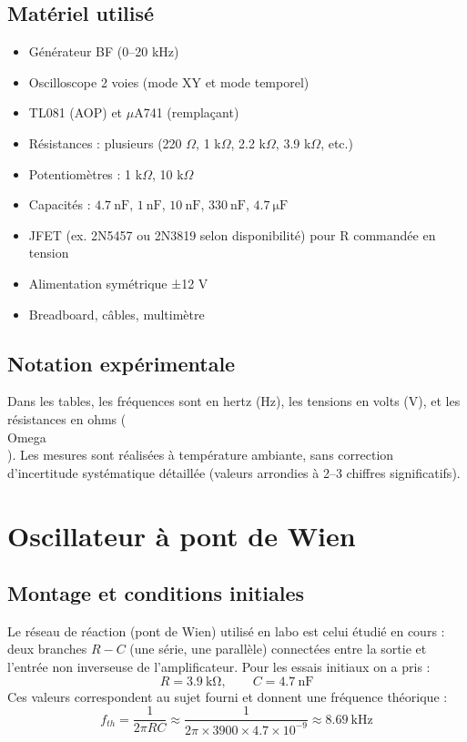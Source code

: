 \documentclass[11pt,a4paper]{report}
\begin{document}
\section*{Matériel utilisé}
\begin{itemize}
    \item Générateur BF (0--20 kHz)
    \item Oscilloscope 2 voies (mode XY et mode temporel)
    \item TL081 (AOP) et $\mu$A741 (remplaçant)
    \item Résistances : plusieurs (220 \(\Omega\), 1 k\(\Omega\), 2.2 k\(\Omega\), 3.9 k\(\Omega\), etc.)
    \item Potentiomètres : 1 k\(\Omega\), 10 k\(\Omega\)
    \item Capacités : \(\SI{4.7}{\nano\farad}\), \(\SI{1}{\nano\farad}\), \(\SI{10}{\nano\farad}\), \(\SI{330}{\nano\farad}\), \(\SI{4.7}{\micro\farad}\)
    \item JFET (ex. 2N5457 ou 2N3819 selon disponibilité) pour R commandée en tension
    \item Alimentation symétrique ±12 V
    \item Breadboard, câbles, multimètre
\end{itemize}

\section*{Notation expérimentale}
Dans les tables, les fréquences sont en hertz (Hz), les tensions en volts (V), et les résistances en ohms (\\Omega\\). Les mesures sont réalisées à température ambiante, sans correction d'incertitude systématique détaillée (valeurs arrondies à 2–3 chiffres significatifs).

\clearpage

\chapter{Oscillateur à pont de Wien}

\section{Montage et conditions initiales}
Le réseau de réaction (pont de Wien) utilisé en labo est celui étudié en cours :
deux branches \(R\!-\!C\) (une série, une parallèle) connectées entre la sortie et l'entrée non
inverseuse de l'amplificateur. Pour les essais initiaux on a pris :
\[
R = \SI{3.9}{\kilo\ohm}, \qquad C = \SI{4.7}{\nano\farad}
\]
Ces valeurs correspondent au sujet fourni et donnent une fréquence théorique :
\[
f_{th} = \frac{1}{2\pi RC} \approx \frac{1}{2\pi \times 3900 \times 4.7\times 10^{-9}} \approx \SI{8.69}{\kilo\hertz}
\]
\end{document}
